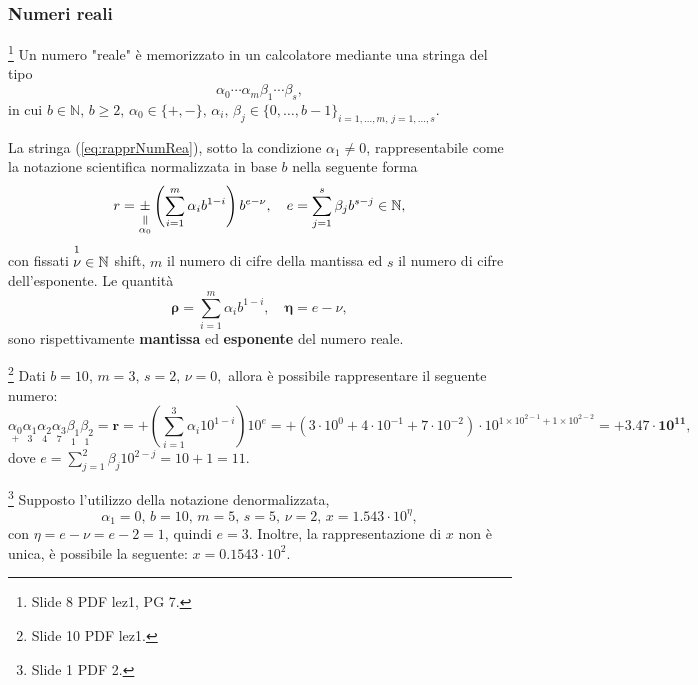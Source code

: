\subsubsection{Numeri reali}\footnote{Slide 8 PDF lez1, PG 7.}
Un numero "reale" è memorizzato in un calcolatore mediante una stringa del tipo
\begin{equation}\label{eq:rapprNumRea}
    \alpha_0\cdots\alpha_m\beta_1\cdots\beta_s,
\end{equation}
in cui $b\in\mathbb N,\, b\geq 2,\, \alpha_0\in\{+,-\},\, \alpha_i,\,\beta_j\in\{0,\hdots,b-1\}_{i=1,\hdots,m,\, j=1,\hdots,s}.$
\begin{definition}
    La stringa (\ref{eq:rapprNumRea}), sotto la condizione $\alpha_1\neq 0$, rappresentabile come la notazione scientifica normalizzata in base $b$ nella seguente forma
    \begin{equation}\label{eq:rapprSciNorm}
        r=\equalto{\pm}{\alpha_0}\left(\sum_{i=1}^m\alpha_ib^{1-i}\right)b^{e-\nu},\quad e=\sum_{j=1}^s\beta_jb^{s-j}\in\mathbb N,
    \end{equation}
    con fissati $\overset{\footnotemark}{\nu}\in\mathbb N$ shift, $m$ il numero di cifre della mantissa ed $s$ il numero di cifre dell'esponente. Le quantità
    \begin{equation}\label{eq:mantExpRea}
        \boldsymbol\rho = \sum_{i=1}^m\alpha_ib^{1-i},\quad \boldsymbol\eta = e-\nu,
    \end{equation}
    sono rispettivamente \textbf{mantissa} ed \textbf{esponente} del numero reale.
\end{definition}

\begin{example}\footnote{Slide 10 PDF lez1.}
    Dati $b=10,\, m=3,\, s=2,\, \nu=0,$ allora è possibile rappresentare il seguente numero:
    \begin{equation*}
        \underset{+}{\alpha_0}\underset{3}{\alpha_1}\underset{4}{\alpha_2}\underset{7}{\alpha_3}\underset{1}{\beta_1}\underset{1}{\beta_2}=\boldsymbol r=+\left(\sum_{i=1}^3\alpha_i10^{1-i}\right)10^{e}=+(3\cdot 10^0+4\cdot 10^{-1}+7\cdot 10^{-2})\cdot 10^{1\times 10^{2-1} + 1\times 10^{2-2}}=\boldsymbol{+3.47\cdot 10^{11}},
    \end{equation*}
    dove $e=\sum_{j=1}^2\beta_j10^{2-j}=10+1=11.$
\end{example}
\begin{example}
    \footnote{Slide 1 PDF 2.} Supposto l'utilizzo della notazione denormalizzata,
    \begin{equation*}
        \alpha_1=0,\, b=10,\, m=5,\, s=5,\, \nu=2,\, x=1.543\cdot 10^\eta,
    \end{equation*}
    con $\eta=e-\nu=e-2=1$, quindi $e=3$. Inoltre, la rappresentazione di $x$ non è unica, è possibile la seguente: $x=0.1543\cdot 10^2.$ 
\end{example}

